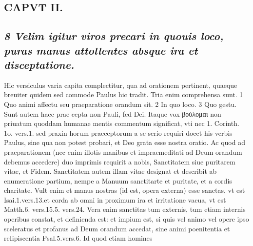 \documentclass{article}
\begin{document}
\begin{pages}
\section*{CAPVT II. }
\marginpar{[ p.65 ]}
{}
\subsection*{\textit{8 Velim igitur viros precari in quouis loco, puras manus attollentes absque ira et disceptatione. }}\pstart Hic versiculus varia capita complectitur, qua ad orationem pertinent, quaeque breuiter quidem sed commode Paulus hic tradit. Tria enim comprehensa sunt. 1 Quo animi affectu seu praeparatione orandum sit. 2 In quo loco. 3 Quo gestu.  \pend\pstart Sunt autem haec prae cepta non Pauli, fed Dei. Itaque vox βούλομαι non priuatum quoddam humanae mentis commentum significat, vti nec 1. Corinth. 1o. vers.1. sed praxin horum praeceptorum a se serio requiri docet his verbis Paulus, sine qua non potest probari, et Deo grata esse nostra oratio.  \pend\pstart Ac quod ad praeparationem (nec enim illotis manibus et impraemeditati ad Deum orandum debemus accedere) duo imprimis requirit a nobis, Sanctitatem siue puritarem vitae, et Fidem.  \pend\pstart Sanctitatem autem illam vitae designat et describit ab enumeratione partium, nempe a Manuum sanctitarte et puritate, et a cordis charitate. Vult enim et manus nostras (id est, opera externa) esse sanctas, vt est Isai.1.vers.13.et corda ab omni in proximum ira et irritatione vacua, vt est Matth.6. vers.15.5. vers.24. Vera enim sanctitas tum externis, tum etiam internis operibus constat, et definienda est: et impium est, si quis vel animo vel opere ipso sceleratus et profanus ad Deum orandum accedat, sine animi poenitentia et reIipiscentia Psal.5.vers.6. Id quod etiam homines  \pend

\end{pages}
\end{document}
